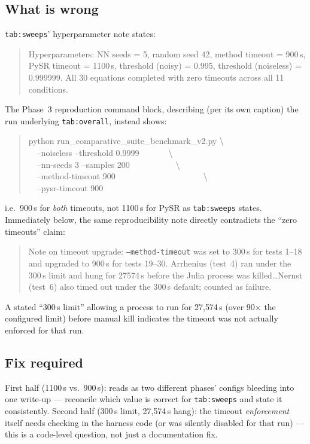 \documentclass[11pt]{article}
\newenvironment{evidence}
  {\begin{quote}\small\ttfamily}
  {\end{quote}}
\begin{document}
\subsection*{What is wrong}
\texttt{tab:sweeps}' hyperparameter note states:
\begin{evidence}
Hyperparameters: NN seeds = 5, random seed 42, method timeout = 900\,s,
PySR timeout = 1100\,s, threshold (noisy) = 0.995, threshold (noiseless) =
0.999999. All 30 equations completed with zero timeouts across all 11
conditions.
\end{evidence}
The Phase~3 reproduction command block, describing (per its own caption)
the run underlying \texttt{tab:overall}, instead shows:
\begin{evidence}
python run\_comparative\_suite\_benchmark\_v2.py \textbackslash\\
\ \ --noiseless --threshold 0.9999\ \ \ \ \ \ \ \textbackslash\\
\ \ --nn-seeds 3 --samples 200\ \ \ \ \ \ \ \ \ \ \ \textbackslash\\
\ \ --method-timeout 900\ \ \ \ \ \ \ \ \ \ \ \ \ \ \ \ \ \ \ \ \ \textbackslash\\
\ \ --pysr-timeout 900
\end{evidence}
i.e.\ 900\,s for \emph{both} timeouts, not 1100\,s for PySR as
\texttt{tab:sweeps} states. Immediately below, the same reproducibility
note directly contradicts the ``zero timeouts'' claim:
\begin{evidence}
Note on timeout upgrade: \texttt{--method-timeout} was set to 300\,s for
tests 1--18 and upgraded to 900\,s for tests 19--30. Arrhenius (test~4) ran
under the 300\,s limit and hung for 27574\,s before the Julia process was
killed\ldots Nernst (test~6) also timed out under the 300\,s default;
counted as failure.
\end{evidence}
A stated ``300\,s limit'' allowing a process to run for 27{,}574\,s (over
90$\times$ the configured limit) before manual kill indicates the timeout
was not actually enforced for that run.

\subsection*{Fix required}
First half (1100\,s vs.\ 900\,s): reads as two different phases' configs
bleeding into one write-up --- reconcile which value is correct for
\texttt{tab:sweeps} and state it consistently. Second half (300\,s limit,
27{,}574\,s hang): the timeout \emph{enforcement} itself needs checking in
the harness code (or was silently disabled for that run) --- this is a
code-level question, not just a documentation fix.
\end{document}
